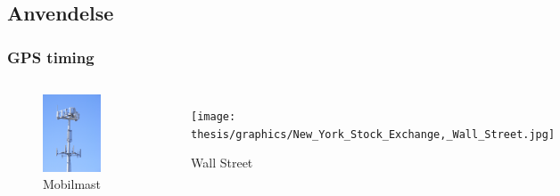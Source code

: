 \documentclass[xcolor=table]{beamer}
\begin{document}
\subsection{Anvendelse}
\begin{frame}
\frametitle{GPS timing}
  \begin{columns}
        \begin{figure}
        \includegraphics[scale=0.045]{thesis/graphics/Cell-Tower.jpg}
        \caption{Mobilmast \cite{CELLTOWER}}
      \end{figure}
      \vspace{-30pt}
    \begin{figure}
        \texttt{[image: thesis/graphics/New\_York\_Stock\_Exchange,\_Wall\_Street.jpg]}
        \caption{Wall Street \cite{NEWYORK}}
      \end{figure}
  \end{columns}
\end{frame}
\end{document}
